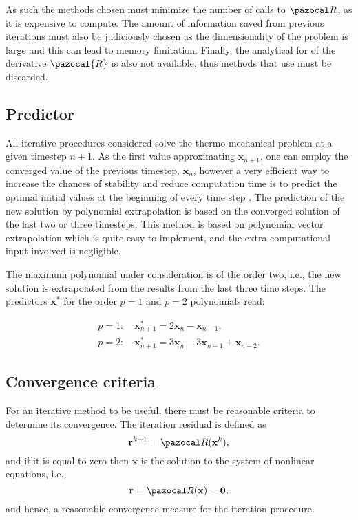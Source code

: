 As such the methods chosen must minimize the number of calls to \(\pazocal R\), as it is expensive to compute.
The amount of information saved from previous iterations must also be judiciously chosen as the dimensionality of the problem is large and this can lead to memory limitation.
Finally, the analytical for of the derivative \(\pazocal{R}\) is also not available, thus methods that use must be discarded.

\subsection{Predictor}

All iterative procedures considered solve the thermo-mechanical problem at a given timestep \(n+1\).
As the first value approximating \(\mathbf x_{n+1}\), one can employ the converged value of the previous timestep, \(\mathbf x_n\), however a very efficient way to increase the chances of stability and reduce computation time is to predict the optimal initial values at the beginning of every time step \citep{erbts_accelerated_2012, erbts_partitioned_2015, wendt_partitioned_2015}.
The prediction of the new solution by polynomial extrapolation is based on the converged solution of the last two or three timesteps.
This method is based on polynomial vector extrapolation which is quite easy to implement, and the extra computational input involved is negligible.

The maximum polynomial under consideration is of the order two, i.e., the new solution is extrapolated from the results from the last three time steps.
The predictors $\mathbf{x}^{*}$ for the order $p=1$ and $p=2$ polynomials read:
\begin{highlight}[innertopmargin=-5pt]
\begin{gather}
p=1:\quad \mathbf{x}_{n+1}^{*}=2 \mathbf{x}_{n}-\mathbf{x}_{n-1}, \\
p=2:\quad \mathbf{x}_{n+1}^{*}=3 \mathbf{x}_{n}-3 \mathbf{x}_{n-1}+\mathbf{x}_{n-2}.
\end{gather}
\end{highlight}

\subsection{Convergence criteria}

For an iterative method to be useful, there must be reasonable criteria to determine its convergence.
The iteration residual is defined as
\begin{equation}
\mathbf r^{k+1} = \pazocal R(\mathbf x^{k}),
\end{equation}
and if it is equal to zero then $\mathbf x$ is the solution to the system of nonlinear equations, i.e.,
\begin{equation} \label{eq:residual_definition}
\mathbf r = \pazocal R(\mathbf x) = \mathbf 0,
\end{equation}
and hence, a reasonable convergence measure for the iteration procedure.

